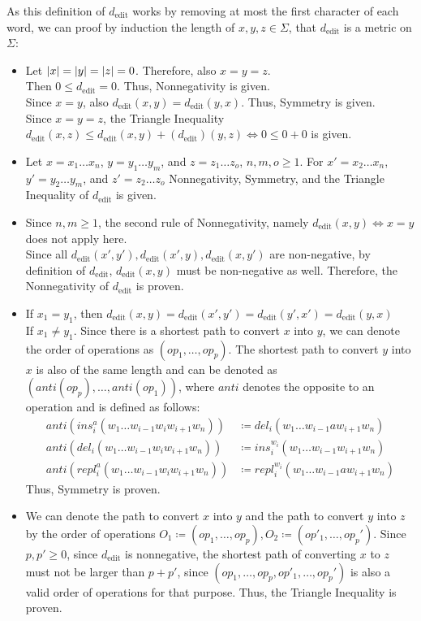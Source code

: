 \documentclass[12pt]{article}
\DeclarePairedDelimiter\abs{\lvert}{\rvert}
\begin{document}
As this definition of $d_{\text{edit}}$ works by removing at most the first character of each word, we can proof by induction the length of $x,y,z \in \Sigma$, that $d_{\text{edit}}$ is a metric on $\Sigma$:
\begin{itemize}
	\item	Let $\abs{x}=\abs{y}=\abs{z}=0$. Therefore, also $x=y=z$. \\
			Then $0 \leq d_{\text{edit}} = 0$. Thus, Nonnegativity is given. \\
			Since $x=y$, also $d_{\text{edit}}(x,y) = d_{\text{edit}}(y,x)$. Thus, Symmetry is given. \\
			Since $x=y=z$, the Triangle Inequality $d_{\text{edit}}(x,z) \leq d_{\text{edit}}(x,y) + (d_{\text{edit}})(y,z) \Leftrightarrow 0 \leq 0 + 0$ is given.
	\item 	Let $x=x_1 \dots x_n$, $y=y_1 \dots y_m$, and $z=z_1 \dots z_o$, $n,m,o \geq 1$. For $x'=x_2 \dots x_n$, $y'=y_2 \dots y_m$, and $z'=z_2 \dots z_o$ Nonnegativity, Symmetry, and the Triangle Inequality of $d_{\text{edit}}$ is given.
	\item	Since $n,m \geq 1$, the second rule of Nonnegativity, namely $d_{\text{edit}}(x,y) \Leftrightarrow x=y$ does not apply here. \\
			Since all $d_{\text{edit}}(x',y'), d_{\text{edit}}(x',y), d_{\text{edit}}(x,y')$ are non-negative, by definition of $d_{\text{edit}}$, $d_{\text{edit}}(x,y)$ must be non-negative as well. Therefore, the Nonnegativity of $d_{\text{edit}}$ is proven.
	\item	If $x_1 = y_1$, then $d_{\text{edit}}(x,y) = d_{\text{edit}}(x',y') = d_{\text{edit}}(y',x') = d_{\text{edit}}(y,x)$ \\
			If $x_1 \neq y_1$. Since there is a shortest path to convert $x$ into $y$, we can denote the order of operations as $(op_1, \dots, op_p)$. The shortest path to convert $y$ into $x$ is also of the same length and can be denoted as $(anti(op_p), \dots, anti(op_1))$, where $anti$ denotes the opposite to an operation and is defined as follows:
			\begin{align*}
				anti(ins_i^a(w_1 \dots w_{i-1} w_i w_{i+1} w_n)) & \coloneqq del_i(w_1 \dots w_{i-1} a w_{i+1} w_n) \\
				anti(del_i(w_1 \dots w_{i-1} w_i w_{i+1} w_n)) & \coloneqq ins_{i}^{w_i}(w_1 \dots w_{i-1} w_{i+1} w_n) \\
				anti(repl_i^a(w_1 \dots w_{i-1} w_i w_{i+1} w_n)) & \coloneqq repl_i^{w_i}(w_1 \dots w_{i-1} a w_{i+1} w_n)
			\end{align*}
			Thus, Symmetry is proven.
	\item	We can denote the path to convert $x$ into $y$ and the path to convert $y$ into $z$ by the order of operations $O_1 \coloneqq (op_1, \dots, op_p), O_2 \coloneqq (op'_1, \dots, op_p')$. Since $p,p' \geq 0$, since $d_{\text{edit}}$ is nonnegative, the shortest path of converting $x$ to $z$ must not be larger than $p+p'$, since $(op_1, \dots, op_p, op'_1, \dots, op_p')$ is also a valid order of operations for that purpose. Thus, the Triangle Inequality is proven.
\end{itemize}
\end{document}
